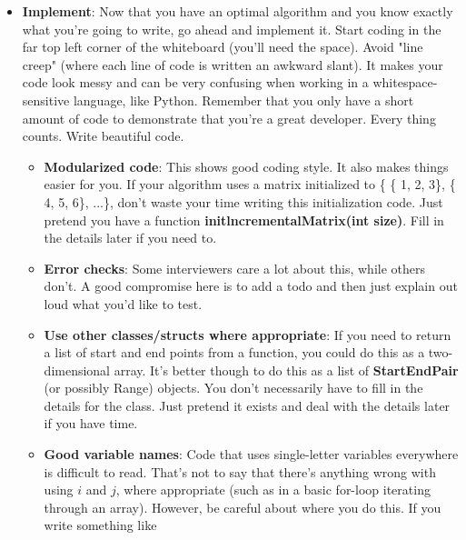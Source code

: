 \documentclass{report}
\begin{document}
\begin{itemize}
            Whiteboard coding is slow-very slow. So is testing your code and fixing it. As a result, you need to make sure that you get it as close to "perfect" in the beginning as possible.
            \bigbreak \noindent 
            Walk through your algorithm and get a feel for the structure of the code. Know what the variables are and when they change.
        \item \textbf{Implement}: Now that you have an optimal algorithm and you know exactly what you're going to write, go ahead and implement it.
            \bigbreak \noindent 
            Start coding in the far top left corner of the whiteboard (you'll need the space). Avoid "line creep" (where each line of code is written an awkward slant). It makes your code look messy and can be very confusing when working in a whitespace-sensitive language, like Python.
            \bigbreak \noindent 
            Remember that you only have a short amount of code to demonstrate that you're a great developer. Every thing counts. Write beautiful code.
            \begin{itemize}
                \item \textbf{Modularized code}: This shows good coding style. It also makes things easier for you. If your algorithm uses a matrix initialized to \{ \{ 1, 2, 3\}, \{ 4, 5, 6\}, ...\}, don't waste your time writing this initialization code. Just pretend you have a function \textbf{initlncrementalMatrix(int size)}. Fill in the details later if you need to.
                \item \textbf{Error checks}: Some interviewers care a lot about this, while others don't. A good compromise here is to add a todo and then just explain out loud what you'd like to test.
                \item \textbf{Use other classes/structs where appropriate}: If you need to return a list of start and end points from a function, you could do this as a two-dimensional array. It's better though to do this as a list of \textbf{StartEndPair} (or possibly Range) objects. You don't necessarily have to fill in the details for the class. Just pretend it exists and deal with the details later if you have time.
                \item \textbf{Good variable names}: Code that uses single-letter variables everywhere is difficult to read. That's not to say that there's anything wrong with using $i$ and $j$, where appropriate (such as in a basic for-loop iterating through an array). However, be careful about where you do this. If you write something like 

\end{itemize}
\end{itemize}
\end{document}
